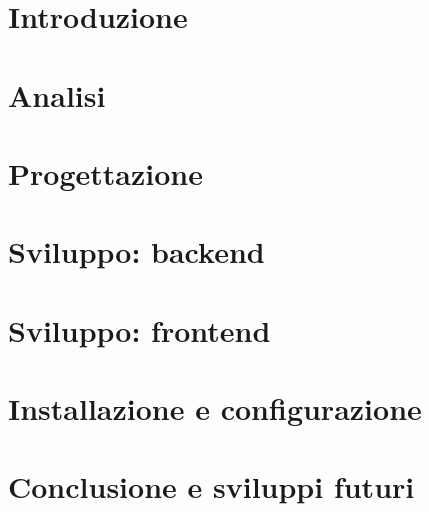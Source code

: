\documentclass{report}
\begin{document}
    
    \tableofcontents
    \listoffigures
    \chapter{Introduzione}
    
    \chapter{Analisi}
    
    \chapter{Progettazione}
    
    \chapter{Sviluppo: backend}
    \chapter{Sviluppo: frontend}
    \chapter{Installazione e configurazione}
    \chapter{Conclusione e sviluppi futuri}
\end{document}
